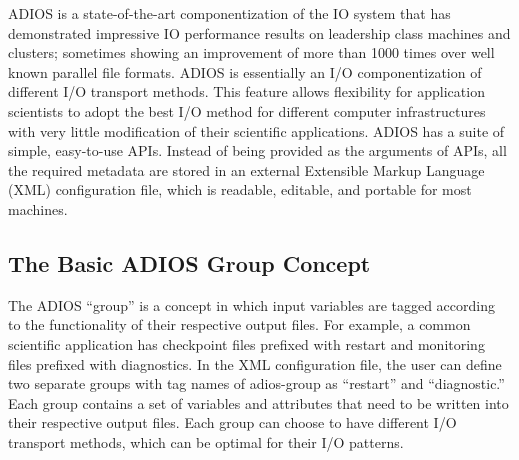 {\color{color01} ADIOS is a state-of-the-art componentization of the IO system 
that has demonstrated impressive IO performance results on leadership class machines 
and clusters; sometimes showing an improvement of more than 1000 times over well 
known parallel file formats. }ADIOS is essentially an I/O componentization of different 
I/O transport methods. This feature allows flexibility for application scientists 
to adopt the best I/O method for different computer infrastructures with very little 
modification of their scientific applications. ADIOS has a suite of simple, easy-to-use 
APIs. Instead of being provided as the arguments of APIs, all the required metadata 
are stored in an external Extensible Markup Language (XML) configuration file, 
which is readable, editable, and portable for most machines. \label{HToc212016592}\label{HToc212016834}\label{HToc84890217}\label{HToc182553325}

\subsection{The Basic ADIOS Group Concept}

\parindent=3pt
The ADIOS ``group'' is a concept in which input variables are tagged according 
to the functionality of their respective output files. For example, a common scientific 
application has checkpoint files prefixed with restart and monitoring files prefixed 
with diagnostics. In the XML configuration file, the user can define two separate 
groups with tag names of adios-group as ``restart'' and ``diagnostic.'' Each group 
contains a set of variables and attributes that need to be written into their respective 
output files. Each group can choose to have different I/O transport methods, which 
can be optimal for their I/O patterns.\label{HToc84890218}\label{HToc212016593}\label{HToc212016835}\label{HToc182553326}

